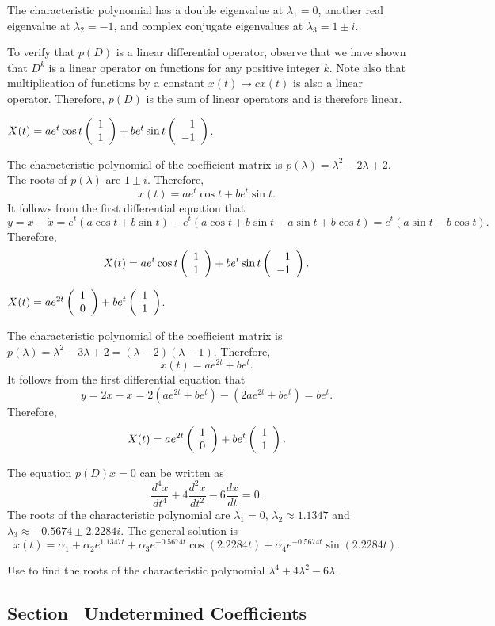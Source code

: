 \soln The characteristic polynomial has a double eigenvalue at
$\lambda_1 = 0$, another real eigenvalue at $\lambda_2 = -1$, and complex
conjugate eigenvalues at $\lambda_3 = 1 \pm i$.

To verify that $p(D)$ is a linear differential operator, observe that we have shown 
that $D^k$ is a linear operator on functions for any positive integer $k$.  Note also
that multiplication of functions by a constant $x(t)\mapsto cx(t)$ is also a linear
operator.  Therefore, $p(D)$ is the sum of linear operators and is therefore linear.

  \ans $X(t) = ae^t\cos t\left(\begin{array}{r} 1 \\ 1\end{array}\right) + be^t\sin t\left(\begin{array}{r} 1 \\ -1\end{array}\right)$.

\soln  The characteristic polynomial of the coefficient matrix is 
$p(\lambda) = \lambda^2-2\lambda+2$.  The roots of $p(\lambda)$ are $1\pm i$. 
Therefore, 
\[
x(t) = ae^t\cos t+be^t\sin t.
\]
It follows from the first differential equation that 
\[
y = x-\dot{x} = e^t(a\cos t+b\sin t) - e^t(a\cos t+b\sin t-a\sin t+b\cos t)
=e^t(a\sin t-b\cos t).
\]
Therefore,
\[
X(t) = ae^t\cos t\left(\begin{array}{r} 1 \\ 1\end{array}\right) + be^t\sin t\left(\begin{array}{r} 1 \\ -1\end{array}\right).
\]

 \ans $X(t) = ae^{2t}\left(\begin{array}{r} 1 \\ 0\end{array}\right) + be^t\left(\begin{array}{r} 1 \\ 1\end{array}\right)$.

\soln  The characteristic polynomial of the coefficient matrix is 
$p(\lambda) = \lambda^2-3\lambda+2=(\lambda-2)(\lambda-1)$.  Therefore, 
\[
x(t) = ae^{2t}+be^t.
\]
It follows from the first differential equation that 
\[
y = 2x-\dot{x} = 2(ae^{2t}+be^t)-(2ae^{2t}+be^t) = be^t.
\]
Therefore,
\[
X(t) = ae^{2t}\left(\begin{array}{r} 1 \\ 0\end{array}\right) + be^t\left(\begin{array}{r} 1 \\ 1\end{array}\right).
\]

 \ans The equation $p(D)x = 0$ can be written as
\[
\frac{d^4x}{dt^4} + 4\frac{d^2x}{dt^2} - 6\frac{dx}{dt} = 0.
\]
The roots of the characteristic polynomial are $\lambda_1 = 0$,
$\lambda_2 \approx 1.1347$ and $\lambda_3 \approx -0.5674 \pm 2.2284i$.
The general solution is
\[
x(t) = \alpha_1 + \alpha_2e^{1.1347t} + \alpha_3e^{-0.5674t}\cos(2.2284t) +
\alpha_4e^{-0.5674t}\sin(2.2284t).
\]

\soln Use \Matlab to find the roots of the characteristic polynomial
$\lambda^4 + 4\lambda^2 - 6\lambda$.



\subsection*{Section~\protect{\ref{sec:2norderinhom}} Undetermined Coefficients}

